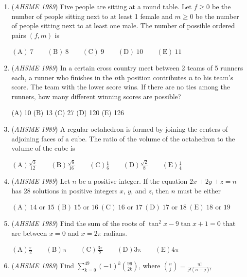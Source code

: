 \begin{enumerate}
$\text{(A)}\ (35,44)\qquad\text{(B)}\ (36,45)\qquad\text{(C)}\ (37,45)\qquad\text{(D)}\ (44,35)\qquad\text{(E)}\ (45,36)$


	\item (\textit{AHSME 1989}) Five people are sitting at a round table. Let $f\geq 0$ be the number of people sitting next to at least 1 female and $m\geq0$ be the number of people sitting next to at least one male. The number of possible ordered pairs $(f,m)$ is


 $\mathrm{(A) \ 7 } \qquad \mathrm{(B) \ 8 } \qquad \mathrm{(C) \ 9 } \qquad \mathrm{(D) \ 10 } \qquad \mathrm{(E) \ 11 }$


	\item (\textit{AHSME 1989}) In a certain cross country meet between 2 teams of 5 runners each, a runner who finishes in the $n$th position contributes $n$ to his team's score. The team with the lower score wins. If there are no ties among the runners, how many different winning scores are possible?


 (A) 10 (B) 13 (C) 27 (D) 120 (E) 126


 

	\item (\textit{AHSME 1989}) A regular octahedron is formed by joining the centers of adjoining faces of a cube. The ratio of the volume of the octahedron to the volume of the cube is


 $\mathrm{(A) \frac{\sqrt{3}}{12} } \qquad \mathrm{(B) \frac{\sqrt{6}}{16} } \qquad \mathrm{(C) \frac{1}{6} } \qquad \mathrm{(D) \frac{\sqrt{2}}{8} } \qquad \mathrm{(E) \frac{1}{4} }$


	\item (\textit{AHSME 1989}) Let $n$ be a positive integer. If the equation $2x+2y+z=n$ has 28 solutions in positive integers $x$, $y$, and $z$, then $n$ must be either 


 $\mathrm{(A)}\ 14 \text{ or } 15\ \mathrm{(B)}\ 15 \text{ or } 16\ \mathrm{(C)}\ 16 \text{ or } 17\ \mathrm{(D)}\ 17 \text{ or } 18\ \mathrm{(E)}\ 18 \text{ or } 19$


	\item (\textit{AHSME 1989}) Find the sum of the roots of $\tan^2x-9\tan x+1=0$ that are between $x=0$ and $x=2\pi$ radians.


 $\mathrm{(A)  \frac{\pi}{2} } \qquad \mathrm{(B) \pi } \qquad \mathrm{(C) \frac{3\pi}{2} } \qquad \mathrm{(D) 3\pi } \qquad \mathrm{(E) 4\pi }$


	\item (\textit{AHSME 1989}) Find $\sum_{k=0}^{49}(-1)^k\binom{99}{2k}$, where $\binom{n}{j}=\frac{n!}{j!(n-j)!}$



\end{enumerate}
